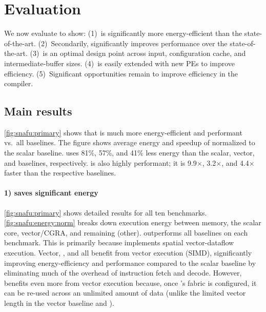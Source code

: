 \section{Evaluation}
\label{snafu:eval}

\figSNAFUPrimaryResults

We now evaluate \snafuarch to show:
(1)~\snafuarch is significantly more energy-efficient than the state-of-the-art.
(2)~Secondarily, \snafuarch significantly improves performance over the state-of-the-art.
(3)~\snafuarch is an optimal design point across input, configuration cache, and intermediate-buffer sizes.
(4)~\snafuframe is easily extended with new PEs to improve efficiency.
(5)~Significant opportunities remain to improve efficiency in the compiler.

\figSNAFUSensUnrollResults

\subsection{Main results}
\autoref{fig:snafu:primary} shows that \snafuarch is much more energy-efficient and performant vs.\ all baselines.
% 
The figure shows average energy and speedup of \snafuarch normalized to the scalar baseline.
% 
\snafuarch uses 81\%, 57\%, and 41\% less energy than the scalar, vector, and \manic baselines, respectively.
% 
\snafuarch is also highly performant; it is 9.9$\times$, 3.2$\times$, and 4.4$\times$ faster than the respective baselines.
% 

\paragraph{1) \snafuarch saves significant energy}
\autoref{fig:snafu:primary} shows detailed results for all ten benchmarks.
% 
\autoref{fig:snafu:energy:norm} breaks down execution energy between memory, the scalar core, vector/CGRA, and remaining (other).
% 
\snafuarch outperforms all baselines on each benchmark.
% 
This is primarily because \snafuarch implements spatial vector-dataflow execution.
%
Vector, \manic, and \snafuarch all benefit from vector execution (SIMD), significantly improving energy-efficiency and performance compared to the scalar baseline by eliminating much of the overhead of instruction fetch and decode.
%
However, \snafuarch benefits even more from vector execution
because, once \snafuarch's fabric is configured, it can be re-used across an unlimited amount of data
(unlike the limited vector length in the vector baseline and \manic).

